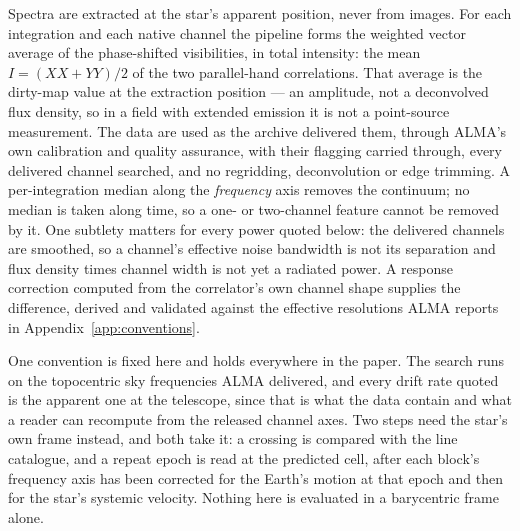 Spectra are extracted at the star's apparent position, never from images.
For each integration and each native channel the pipeline forms the weighted
vector average of the phase-shifted visibilities, in total intensity: the
mean $I=(XX+YY)/2$ of the two parallel-hand correlations. That average is the
dirty-map value at the extraction position --- an amplitude, not a
deconvolved flux density, so in a field with extended emission it is not a
point-source measurement. The data are used as the archive delivered them,
through ALMA's own calibration and quality assurance, with their flagging
carried through, every delivered channel searched, and no regridding,
deconvolution or edge trimming. A per-integration median along the
\emph{frequency} axis removes the continuum; no median is taken along
time, so a one- or two-channel feature cannot be removed by it. One
subtlety matters for every power quoted below: the delivered channels are
smoothed, so a channel's effective noise bandwidth is not its separation and
flux density times channel width is not yet a radiated power. A response
correction computed from the correlator's own channel shape supplies the
difference, derived and validated against the effective resolutions ALMA
reports in Appendix~\ref{app:conventions}.

One convention is fixed here and holds everywhere in the paper. The search
runs on the topocentric sky frequencies ALMA delivered, and every drift rate
quoted is the apparent one at the telescope, since that is what the data
contain and what a reader can recompute from the released channel axes. Two
steps need the star's own frame instead, and both take it: a crossing is
compared with the line catalogue, and a repeat epoch is read at the predicted
cell, after each block's frequency axis has been corrected for the Earth's
motion at that epoch and then for the star's systemic velocity. Nothing here
is evaluated in a barycentric frame alone.

